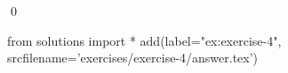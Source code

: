 
\begin{ex} 
  \label{ex:exercise-4}
  
  \qed
\end{ex} 
\begin{python0}
from solutions import *
add(label="ex:exercise-4",
    srcfilename='exercises/exercise-4/answer.tex') 
\end{python0}
